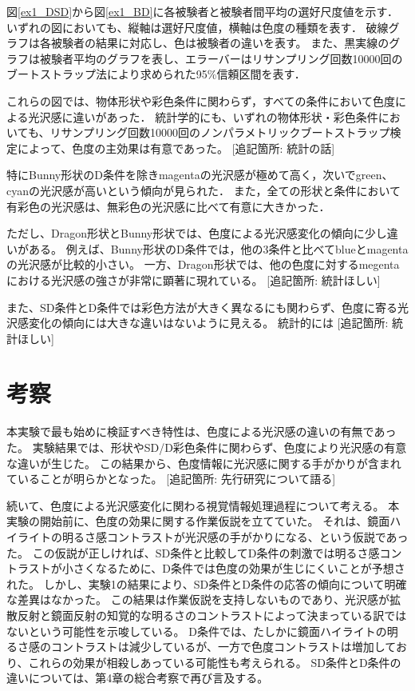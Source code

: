             図\ref{ex1_DSD}から図\ref{ex1_BD}に各被験者と被験者間平均の選好尺度値を示す．
            いずれの図においても、縦軸は選好尺度値，横軸は色度の種類を表す．
            破線グラフは各被験者の結果に対応し、色は被験者の違いを表す。
            また、黒実線のグラフは被験者平均のグラフを表し、エラーバーはリサンプリング回数10000回のブートストラップ法により求められた95\%信頼区間を表す．

            これらの図では、物体形状や彩色条件に関わらず，すべての条件において色度による光沢感に違いがあった．
            統計学的にも、いずれの物体形状・彩色条件においても、リサンプリング回数10000回のノンパラメトリックブートストラップ検定によって、色度の主効果は有意であった。
            [追記箇所: 統計の話]

            特にBunny形状のD条件を除きmagentaの光沢感が極めて高く，次いでgreen、cyanの光沢感が高いという傾向が見られた．
            また，全ての形状と条件において有彩色の光沢感は、無彩色の光沢感に比べて有意に大きかった．


            ただし、Dragon形状とBunny形状では、色度による光沢感変化の傾向に少し違いがある。
            例えば、Bunny形状のD条件では，他の3条件と比べてblueとmagentaの光沢感が比較的小さい。
            一方、Dragon形状では、他の色度に対するmegentaにおける光沢感の強さが非常に顕著に現れている。
            [追記箇所: 統計ほしい]

            また、SD条件とD条件では彩色方法が大きく異なるにも関わらず、色度に寄る光沢感変化の傾向には大きな違いはないように見える。
            統計的には
            [追記箇所: 統計ほしい]


    \section{考察}
        本実験で最も始めに検証すべき特性は、色度による光沢感の違いの有無であった。
        実験結果では、形状やSD/D彩色条件に関わらず、色度により光沢感の有意な違いが生じた。
        この結果から、色度情報に光沢感に関する手がかりが含まれていることが明らかとなった。
        [追記箇所: 先行研究について語る]

        続いて、色度による光沢感変化に関わる視覚情報処理過程について考える。
        本実験の開始前に、色度の効果に関する作業仮説を立てていた。
        それは、鏡面ハイライトの明るさ感コントラストが光沢感の手がかりになる、という仮説であった。
        この仮説が正しければ、SD条件と比較してD条件の刺激では明るさ感コントラストが小さくなるために、D条件では色度の効果が生じにくいことが予想された。
        しかし、実験1の結果により、SD条件とD条件の応答の傾向について明確な差異はなかった。
        この結果は作業仮説を支持しないものであり、光沢感が拡散反射と鏡面反射の知覚的な明るさのコントラストによって決まっている訳ではないという可能性を示唆している。
        D条件では、たしかに鏡面ハイライトの明るさ感のコントラストは減少しているが、一方で色度コントラストは増加しており、これらの効果が相殺しあっている可能性も考えられる。
        SD条件とD条件の違いについては、第4章の総合考察で再び言及する。

